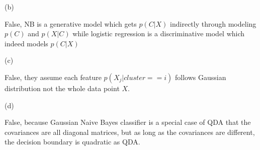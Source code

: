 \documentclass[11pt]{article}
\begin{document}
\begin{enumerate}
\medskip

(b)

False, NB is a generative model which gets $p(C|X)$ indirectly through modeling $p(C)$ and $p(X|C)$ while logistic regression is a discriminative model which indeed models $p(C|X)$

\medskip

(c)

False, they assume each feature $p(X_j|cluster==i)$ follows Gaussian distribution not the whole data point $X$.

\medskip

(d)

False, because Gaussian Naive Bayes classifier is a special case of QDA that the covariances are all diagonal matrices, but as long as the covariances are different, the decision boundary is quadratic as QDA.


\end{enumerate}
\end{document}
